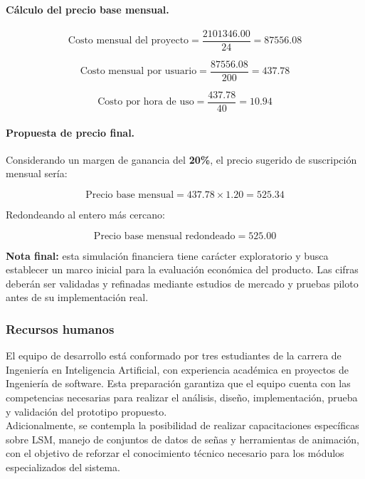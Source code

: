 \paragraph{\textbf{Cálculo del precio base mensual.}}

\[
\text{Costo mensual del proyecto} = \frac{\num{2101346.00}}{24} = \num{87556.08}
\]

\[
\text{Costo mensual por usuario} = \frac{\num{87556.08}}{200} = \num{437.78}
\]

\[
\text{Costo por hora de uso} = \frac{\num{437.78}}{40} = \num{10.94}
\]

\paragraph{\textbf{Propuesta de precio final.}}
Considerando un margen de ganancia del \textbf{20\%}, el precio sugerido de suscripción mensual sería:

\[
\text{Precio base mensual} = \num{437.78} \times 1.20 = \num{525.34}
\]

Redondeando al entero más cercano:

\[
\text{Precio base mensual redondeado} = \num{525.00}
\]

\begin{flushleft}
	\textbf{Nota final:} esta simulación financiera tiene carácter exploratorio y busca establecer un marco inicial para la evaluación económica del producto. Las cifras deberán ser validadas y refinadas mediante estudios de mercado y pruebas piloto antes de su implementación real.
\end{flushleft}



\subsubsection{Recursos humanos}
El equipo de desarrollo está conformado por tres estudiantes de la carrera de Ingeniería en Inteligencia Artificial, con experiencia académica en proyectos de Ingeniería de software. Esta preparación garantiza que el equipo cuenta con las competencias necesarias para realizar el análisis, diseño, implementación, prueba y validación del prototipo propuesto.\\

Adicionalmente, se contempla la posibilidad de realizar capacitaciones específicas sobre LSM, manejo de conjuntos de datos de señas y herramientas de animación, con el objetivo de reforzar el conocimiento técnico necesario para los módulos especializados del sistema.\\

